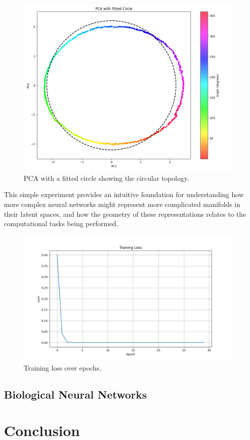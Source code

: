 \documentclass[11pt,a4paper]{article}
\begin{document}
\begin{figure}[h]
    \centering
    \includegraphics[width=0.8\linewidth]{results/pca_fitted_circle.png}
    \caption{PCA with a fitted circle showing the circular topology.}
    \label{fig:pca_fitted_circle}
\end{figure}

This simple experiment provides an intuitive foundation for understanding how more complex neural networks might represent more complicated manifolds in their latent spaces, and how the geometry of these representations relates to the computational tasks being performed.

\begin{figure}[h]
    \centering
    \includegraphics[width=0.8\linewidth]{results/training_loss.png}
    \caption{Training loss over epochs.}
    \label{fig:training_loss}
\end{figure}

\subsection{Biological Neural Networks}

\section{Conclusion}



\end{document}
